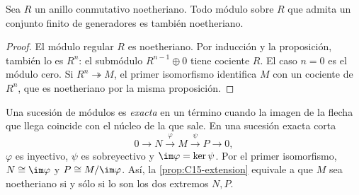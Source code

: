 \begin{coro}\label{coro:C15-finito-noetheriano}
Sea $R$ un anillo conmutativo noetheriano. Todo módulo sobre $R$ que admita un conjunto finito de generadores es también noetheriano.
\end{coro}
\begin{proof}
El módulo regular $R$ es noetheriano. Por inducción y la proposición, también lo es $R^n$: el submódulo $R^{n-1}\oplus0$ tiene cociente $R$. El caso $n=0$ es el módulo cero. Si $R^n\twoheadrightarrow M$, el primer isomorfismo identifica $M$ con un cociente de $R^n$, que es noetheriano por la misma proposición.
\end{proof}

Una sucesión de módulos es \emph{exacta} en un término cuando la imagen de la flecha que llega coincide con el núcleo de la que sale. En una sucesión exacta corta
\[
0\longrightarrow N\xrightarrow{\varphi}M
\xrightarrow{\psi}P\longrightarrow0,
\]
$\varphi$ es inyectivo, $\psi$ es sobreyectivo y $\im\varphi=\ker\psi$. Por el primer isomorfismo, $N\cong\im\varphi$ y $P\cong M/\im\varphi$. Así, la \cref{prop:C15-extension} equivale a que $M$ sea noetheriano si y sólo si lo son los dos extremos $N,P$.

